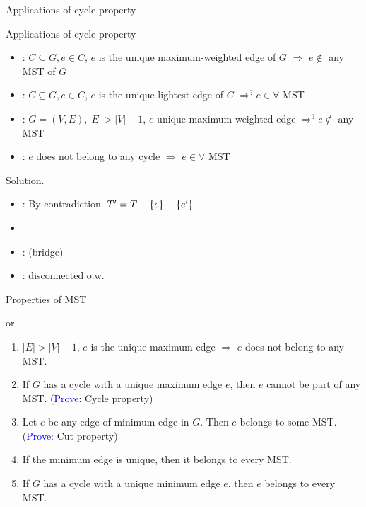 \begin{frame}{Applications of cycle property}
  \begin{exampleblock}{Applications of cycle property }
    \begin{itemize}
      \item {}: $C \subseteq G, e \in C$, $e$ is the unique maximum-weighted edge of $G$ $\Rightarrow$ $e \notin$ any MST of $G$
      \item {}: $C \subseteq G, e \in C$, $e$ is the unique lightest edge of $C$ $\Rightarrow^{?} e \in \forall$ MST
      \item {}: $G = (V, E), |E| > |V| - 1$, $e$ unique maximum-weighted edge $\Rightarrow^{?} e \notin$ any MST
      \item {}: $e$ does not belong to any cycle $\Rightarrow$ $e \in \forall$ MST
    \end{itemize}
  \end{exampleblock}

  \begin{block}{Solution.}
    \begin{itemize}
      \item {}: By contradiction. $T' = T - \{e\} + \{e'\}$
      \item {}
      \item {}: (bridge)
      \item {}: disconnected o.w.
    \end{itemize}
  \end{block}
\end{frame}
\begin{frame}{Properties of MST}
  \begin{exampleblock}{\cmark or \xmark {}}
    \begin{enumerate}
      \item \xmark $|E| > |V| - 1$, $e$ is the unique maximum edge $\Rightarrow$
      $e$ does not belong to any MST.
      \item \cmark If $G$ has a cycle with a unique maximum edge $e$, then $e$ cannot
      be part of any MST. (\textcolor{blue}{Prove}: Cycle property)
      \item \cmark Let $e$ be any edge of minimum edge in $G$. Then $e$ belongs to
      some MST. (\textcolor{blue}{Prove}: Cut property)
      \item \cmark If the minimum edge is unique, then it belongs to every MST.
      \item \xmark If $G$ has a cycle with a unique minimum edge $e$, then $e$
      belongs to every MST.
      \setcounter{enumTemp}{\theenumi}
    \end{enumerate}
  \end{exampleblock}
\end{frame}
